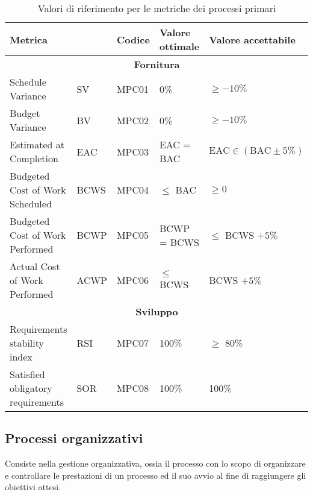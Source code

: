 \begin{table}[H]
    \centering
    \begin{tabularx}{\textwidth}{p{3.5cm}|X|X|l|l}
        \hline
        \multicolumn{2}{l|}{\textbf{Metrica}} & \textbf{Codice}   & \textbf{Valore ottimale}  & \textbf{Valore accettabile}   \\
        \hline
        \multicolumn{5}{c}{\textbf{Fornitura}} \\
        \hline
        Schedule Variance               & SV    & MPC01 & 0\%               & $\ge -10\%$                   \\
        Budget Variance                 & BV    & MPC02 & 0\%               & $\ge -10\%$                   \\
        Estimated at Completion         & EAC   & MPC03 & EAC = BAC         & $\text{EAC} \in (\text{BAC} \pm 5\%)$  \\
        Budgeted Cost of Work Scheduled & BCWS  & MPC04 & $\le$ BAC         & $\ge 0$                       \\
        Budgeted Cost of Work Performed & BCWP  & MPC05 & BCWP = BCWS       & $\le$ BCWS $+ 5\%$            \\
        Actual Cost of Work Performed   & ACWP  & MPC06 & $\le$ BCWS   & BCWS $+ 5\%$                       \\
        \hline
        \multicolumn{5}{c}{\textbf{Sviluppo}} \\
        \hline 
        Requirements stability index    & RSI   & MPC07 & 100\%             & $\ge$ 80\%                     \\
        Satisfied obligatory requirements & SOR & MPC08 & 100\%             & 100\%                         \\
        \hline
    \end{tabularx}
    \caption{Valori di riferimento per le metriche dei processi primari}
\end{table}


\subsection{Processi organizzativi}
Consiste nella gestione organizzativa, ossia il processo con lo scopo di organizzare e controllare le prestazioni di un processo ed il suo avvio al fine di raggiungere gli obiettivi attesi.

